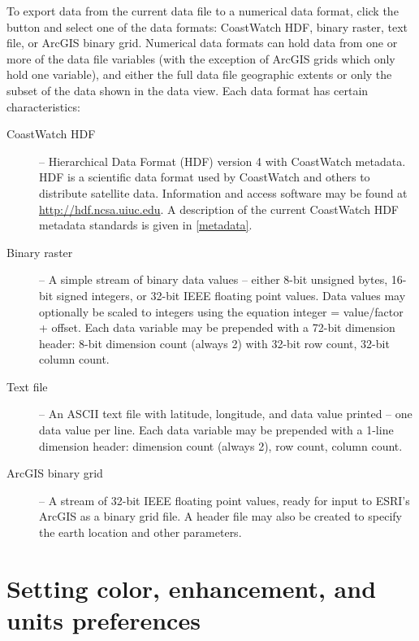 To export data from the current data file to a numerical data
format, click the  button and select one
of the data formats: CoastWatch HDF, binary raster, text file, or
ArcGIS binary grid.  Numerical data formats can hold data from
one or more of the data file variables (with the exception of
ArcGIS grids which only hold one variable), and either the full
data file geographic extents or only the subset of the data shown
in the data view.  Each data format has certain characteristics:
\begin{description}

\item[CoastWatch HDF] -- Hierarchical Data Format (HDF) version 4
with CoastWatch metadata. HDF is a scientific data format used by
CoastWatch and others to distribute satellite data. Information
and access software may be found at
\url{http://hdf.ncsa.uiuc.edu}. A description of the current
CoastWatch HDF metadata standards is given in \autoref{metadata}.

\item[Binary raster] -- A simple stream of binary data values --
either 8-bit unsigned bytes, 16-bit signed integers, or 32-bit
IEEE floating point values. Data values may optionally be scaled
to integers using the equation integer = value/factor +
offset. Each data variable may be prepended with a 72-bit
dimension header: 8-bit dimension count (always 2) with 32-bit
row count, 32-bit column count.

\item[Text file] -- An ASCII text file with latitude, longitude,
and data value printed -- one data value per line. Each data
variable may be prepended with a 1-line dimension header:
dimension count (always 2), row count, column count.

\item[ArcGIS binary grid] -- A stream of 32-bit IEEE floating
point values, ready for input to ESRI's ArcGIS as a binary grid
file. A header file may also be created to specify the earth
location and other parameters.

\end{description}

\section{Setting color, enhancement, and units preferences}
\label{preferences}

